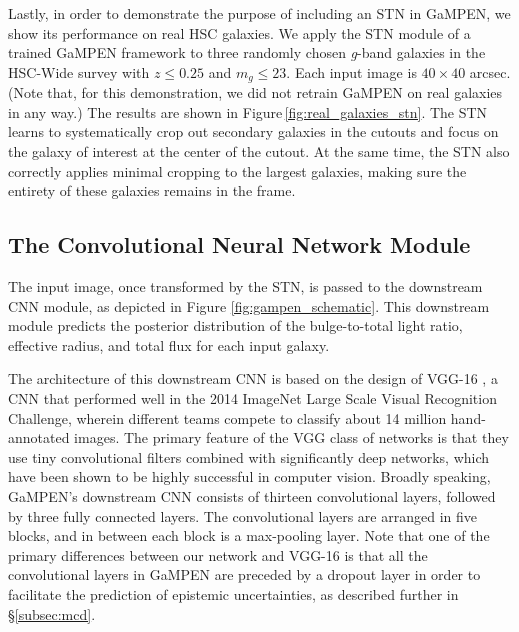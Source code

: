 \documentclass[twocolumn]{aastex63}
\newcommand\gampen{GaMPEN}
\begin{document}
\begin{CJK*}{UTF8}{gbsn}
Lastly, in order to demonstrate the purpose of including an STN in \gampen{}, we show its performance on real HSC galaxies. We apply the STN module of a trained \gampen{} framework to three randomly chosen \textit{g}-band galaxies in the HSC-Wide survey with $z \leq 0.25$ and $m_g \leq 23$. Each input image is $40 \times 40$ arcsec. (Note that, for this demonstration, we did not retrain \gampen{} on real galaxies in any way.) The results are shown in Figure\,\ref{fig:real_galaxies_stn}. The STN learns to systematically crop out secondary galaxies in the cutouts and focus on the galaxy of interest at the center of the cutout. At the same time, the STN also correctly applies minimal cropping to the largest galaxies, making sure the entirety of these galaxies remains in the frame. 

\subsection{The Convolutional Neural Network Module} \label{subsec:cnn}

The input image, once transformed by the STN, is passed to the downstream CNN module, as depicted in Figure \ref{fig:gampen_schematic}. This downstream module predicts the posterior distribution of the bulge-to-total light ratio, effective radius, and total flux for each input galaxy. 

The architecture of this downstream CNN is based on the design of VGG-16 \citep{vgg}, a CNN that performed well in the 2014 ImageNet Large Scale Visual Recognition Challenge, wherein different teams compete to classify about 14 million hand-annotated images. The primary feature of the VGG class of networks is that they use tiny convolutional filters combined with significantly deep networks, which have been shown to be highly successful in computer vision. Broadly speaking, \gampen{}'s downstream CNN consists of thirteen convolutional layers, followed by three fully connected layers. The convolutional layers are arranged in five blocks, and in between each block is a max-pooling layer. Note that one of the primary differences between our network and VGG-16 is that all the convolutional layers in \gampen{} are preceded by a dropout layer in order to facilitate the prediction of epistemic uncertainties, as described further in \S \ref{subsec:mcd}. 


\end{CJK*}
\end{document}
